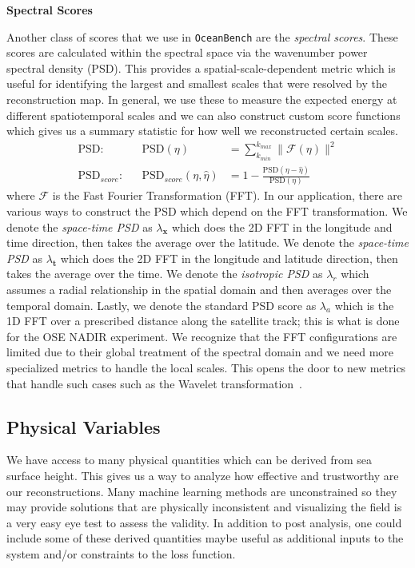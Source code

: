 \textbf{Spectral Scores}

Another class of scores that we use in \texttt{OceanBench} are the \textit{spectral scores}. These scores are calculated within the spectral space via the wavenumber power spectral density (PSD). 
This provides a spatial-scale-dependent metric which is useful for identifying the largest and smallest scales that were resolved by the reconstruction map. 
In general, we use these to measure the expected energy at different spatiotemporal scales and we can also construct custom score functions which gives us a summary statistic for how well we reconstructed certain scales.
%
\begin{align}
    \text{PSD}: &&\text{PSD}(\eta) &= \sum_{k_{min}}^{k_{max}}\|\mathcal{\mathcal{F}(\eta)}\|^2\label{psd}\\
    \text{PSD}_{score}: &&\text{PSD}_{score}(\eta,\hat{\eta}) &= 1 - \frac{\text{PSD}(\eta - \hat{\eta})}{\text{PSD}(\eta)} \label{eq:psd_score}
\end{align}
%
where $\mathcal{F}$ is the Fast Fourier Transformation (FFT). 
In our application, there are various ways to construct the PSD which depend on the FFT transformation.
We denote the \textit{space-time PSD} as $\lambda_\mathbf{x}$ which does the 2D FFT in the longitude and time direction, then takes the average over the latitude.
We denote the \textit{space-time PSD} as $\lambda_\mathbf{t}$ which does the 2D FFT in the longitude and latitude direction, then takes the average over the time.
We denote the \textit{isotropic PSD} as $\lambda_r$ which assumes a radial relationship in the spatial domain and then averages over the temporal domain.
Lastly, we denote the standard PSD score as $\lambda_a$ which is the 1D FFT over a prescribed distance along the satellite track; this is what is done for the OSE NADIR experiment.
We recognize that the FFT configurations are limited due to their global treatment of the spectral domain and we need more specialized metrics to handle the local scales.
This opens the door to new metrics that handle such cases such as the Wavelet transformation~\cite{METRICSWAVELET}.




\subsection*{Physical Variables} \label{sec:physical_variables}

We have access to many physical quantities which can be derived from sea surface height. 
This gives us a way to analyze how effective and trustworthy are our reconstructions. 
Many machine learning methods are unconstrained so they may provide solutions that are physically inconsistent and visualizing the field is a very easy eye test to assess the validity. 
In addition to post analysis, one could include some of these derived quantities maybe useful as additional inputs to the system and/or constraints to the loss function. 

